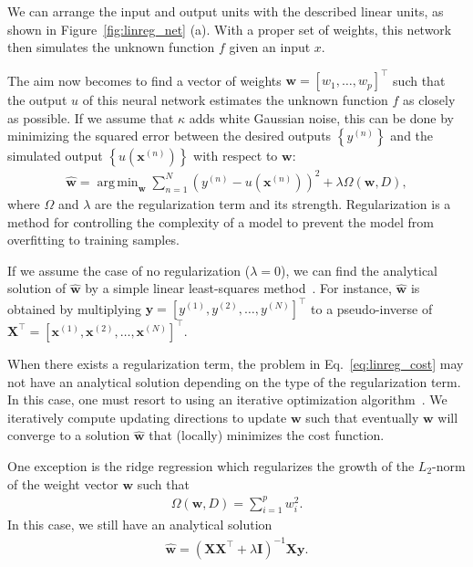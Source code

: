\documentclass{now}
\newcommand{\vect}[1]{\mathbf{#1}}
\newcommand{\matr}[1]{\mathbf{#1}}
\newcommand{\vx}[0]{\vect{x}}
\newcommand{\vy}[0]{\vect{y}}
\newcommand{\vw}[0]{\vect{w}}
\newcommand{\mX}[0]{\matr{X}}
\newcommand{\mI}{\matr{I}}
\DeclareMathOperator*{\argmin}{arg\,min}
\begin{document}
We can arrange the input and output units with the described linear units, as
shown in Figure~\ref{fig:linreg_net} (a). With a proper set of weights, this
network then simulates the unknown function $f$ given an input $x$. 

The aim now becomes to find a vector of weights $\vw = [w_1, \dots, w_p]^\top$
such that the output $u$ of this neural network estimates the unknown function
$f$ as closely as possible. If we assume that $\kappa$ adds white Gaussian
noise, this can be done by minimizing the squared error between the desired
outputs $\left\{ y^{(n)} \right\}$ and the simulated output $\left\{
u(\vx^{(n)}) \right\}$ with respect to $\vw$:
\begin{align}
    \label{eq:linreg_cost}
    \hat{\vw} = \argmin_{\vw} \sum_{n=1}^N \left( y^{(n)}
    - u\left(\vx^{(n)}\right) \right)^2 + \lambda \Omega
    \left(\vw, D\right),
\end{align}
where $\Omega$ and $\lambda$ are the regularization term and its strength.
Regularization is a method for controlling the complexity of a model to prevent
the model from overfitting to training samples.

If we assume the case of no regularization ($\lambda = 0$), we can find the
analytical solution of $\hat{\vw}$ by a simple linear least-squares
method~\citep[see, e.g.,][]{Golub1996}.  For instance, $\hat{\vw}$ is obtained
by
multiplying $\vy = \left[y^{(1)}, y^{(2)}, \dots, y^{(N)} \right]^\top$ to a
pseudo-inverse of $\mX^\top = \left[ \vx^{(1)}, \vx^{(2)}, \dots,
\vx^{(N)}\right]^\top$. 

When there exists a regularization term, the problem in
Eq.~\eqref{eq:linreg_cost} may not have an analytical solution depending on the
type of the regularization term. In this case, one must resort to using an
iterative optimization algorithm~\citep[see, e.g.,][]{Fletcher1987}. We
iteratively compute updating directions to update $\vw$ such that eventually
$\vw$ will converge to a solution $\hat{\vw}$ that (locally) minimizes the cost
function.

One exception is the ridge regression which regularizes the growth of the
$L_2$-norm of the weight vector $\vw$ such that
\begin{align*}
    \Omega(\vw, D) = \sum_{i=1}^p w_i^2.
\end{align*}
In this case, we still have an analytical solution
\begin{align*}
    \hat{\vw} = \left( \mX \mX^\top + \lambda \mI
    \right)^{-1} \mX \vy.
\end{align*}
\end{document}
